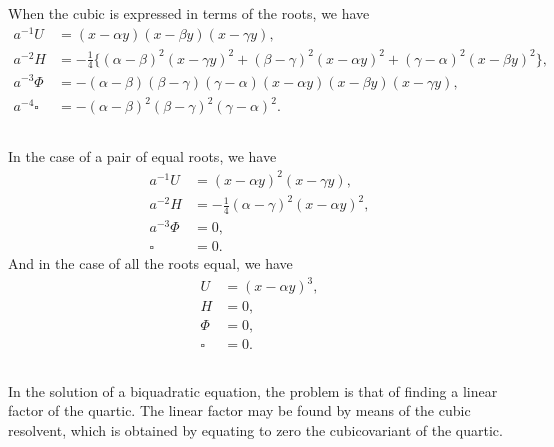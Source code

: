 \documentclass[12pt,a4paper]{article}
\begin{document}
\subsection{}

When the cubic is expressed in terms of the roots, we have
\begin{align*}
a^{-1}U &= (x - \alpha y)(x - \beta y)(x - \gamma y),\\
a^{-2}H &= -\tfrac{1}{4}\{(\alpha - \beta)^2(x - \gamma y)^2 + (\beta - \gamma)^2(x - \alpha y)^2 + (\gamma - \alpha)^2(x - \beta y)^2\},\\
a^{-3}\Phi &= -(\alpha - \beta)(\beta - \gamma)(\gamma - \alpha)(x - \alpha y)(x - \beta y)(x - \gamma y),\\
a^{-4}\square &= -(\alpha - \beta)^2(\beta - \gamma)^2(\gamma - \alpha)^2.
\end{align*}

\subsection{}

In the case of a pair of equal roots, we have
\begin{align*}
a^{-1}U &= (x - \alpha y)^2(x - \gamma y),\\
a^{-2}H &= -\tfrac{1}{4}(\alpha - \gamma)^2(x - \alpha y)^2,\\
a^{-3}\Phi &= 0,\\
\square &= 0.
\end{align*}
And in the case of all the roots equal, we have
\begin{align*}
U &= (x - \alpha y)^3,\\
H &= 0,\\
\Phi &= 0,\\
\square &= 0.
\end{align*}

\subsection{}

In the solution of a biquadratic equation, the problem is that of finding a linear factor of the quartic. The linear factor may be found by means of the cubic resolvent, which is obtained by equating to zero the cubicovariant of the quartic.

\subsection{}
\end{document}
